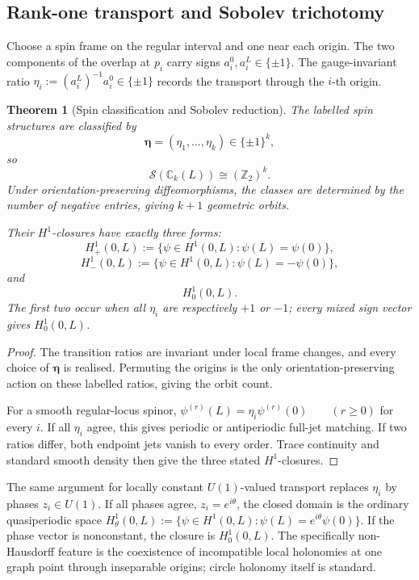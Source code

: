 \documentclass[11pt]{article}
\theoremstyle{plain}
\newtheorem{theorem}{Theorem}[section]
\theoremstyle{definition}
\begin{document}
\subsection{Rank-one transport and Sobolev trichotomy}
\label{subsec:circle-k-spin-classification}
\label{subsec:circle-k-H1}

Choose a spin frame on the regular interval and one near each origin. The
two components of the overlap at \(p_i\) carry signs
\(a_i^0,a_i^L\in\{\pm1\}\).
The gauge-invariant ratio \(\eta_i := (a_i^L)^{-1}a_i^0 \in\{\pm1\}\) records the transport through the \(i\)-th origin.

\begin{theorem}[Spin classification and Sobolev reduction]
\label{thm:circle-k-spin-classification}
The labelled spin structures are classified by
\[
  \boldsymbol{\eta}
  =
  (\eta_1,\ldots,\eta_k)
  \in
  \{\pm1\}^k,
\]
so
\[
  \mathscr S(\mathbb C_k(L))
  \cong
  (\mathbb Z_2)^k.
\]
Under orientation-preserving diffeomorphisms, the classes are determined by
the number of negative entries, giving \(k+1\) geometric orbits.

Their \(H^1\)-closures have exactly three forms:
\[
  H^1_+(0,L)
  :=
  \{\psi\in H^1(0,L):\psi(L)=\psi(0)\},
\]
\[
  H^1_-(0,L)
  :=
  \{\psi\in H^1(0,L):\psi(L)=-\psi(0)\},
\]
and
\[
  H^1_0(0,L).
\]
The first two occur when all \(\eta_i\) are respectively \(+1\) or
\(-1\); every mixed sign vector gives \(H^1_0(0,L)\).
\end{theorem}

\begin{proof}
The transition ratios are invariant under local frame changes, and every
choice of \(\boldsymbol{\eta}\) is realised. Permuting the origins is the
only orientation-preserving action on these labelled ratios, giving the
orbit count.

For a smooth regular-locus spinor, \(\psi^{(r)}(L) = \eta_i\psi^{(r)}(0) \qquad (r\geq0)\) for every \(i\). If all \(\eta_i\) agree, this gives periodic or
antiperiodic full-jet matching. If two ratios differ, both endpoint jets
vanish to every order. Trace continuity and standard smooth density then
give the three stated \(H^1\)-closures.
\end{proof}

The same argument for locally constant \(U(1)\)-valued transport replaces
\(\eta_i\) by phases \(z_i\in U(1)\). If all phases agree,
\(z_i=e^{i\theta}\),
the closed domain is the ordinary quasiperiodic space
\(H^1_\theta(0,L) := \{ \psi\in H^1(0,L): \psi(L)=e^{i\theta}\psi(0) \}\).
If the phase vector is nonconstant, the closure is \(H^1_0(0,L)\).
The specifically non-Hausdorff feature is the coexistence of incompatible local holonomies at one graph point through inseparable origins; circle holonomy itself is standard.
\end{document}
